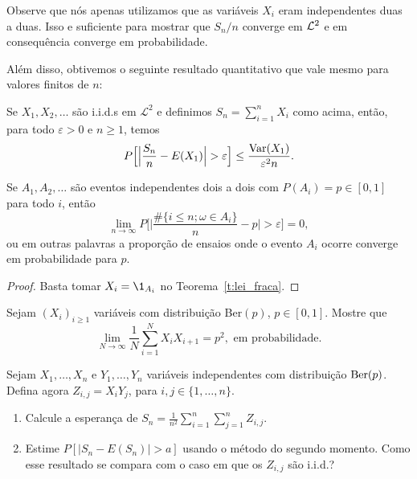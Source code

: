 \begin{remark}
 Observe que nós apenas utilizamos que as variáveis $X_i$ eram independentes duas a duas.
 Isso e suficiente para mostrar que $S_n/n$ converge em ${\mathcal L}^2$ e em consequência converge em probabilidade.
\end{remark}



Além disso, obtivemos o seguinte resultado quantitativo que vale mesmo para valores finitos de $n$:

\begin{scholia}
  Se $X_1, X_2, \dots$ são i.i.d.s em $\mathcal{L}^2$ e definimos $S_n = \sum_{i=1}^n X_i$ como acima, então, para todo $\varepsilon > 0$ e $n \geq 1$, temos
  \begin{equation}
    P \Big[\Big| \frac{S_n}{n} - E(X_1)\Big| > \varepsilon \Big] \leq \frac{\operatorname{Var}(X_1)}{\varepsilon^2 n}.
  \end{equation}
\end{scholia}





\begin{corollary}
  Se $A_1, A_2, \dots$ são eventos independentes dois a dois com $P(A_i) = p \in [0,1]$ para todo $i$, então
  \begin{equation}
    \lim_{n \to \infty} P \Big[ \Big| \frac{\#\{i \leq n; \omega \in A_i\}}{n} - p \Big| > \varepsilon \Big] = 0,
  \end{equation}
  ou em outras palavras a proporção de ensaios onde o evento $A_i$ ocorre converge em probabilidade para $p$.
\end{corollary}

\begin{proof}
  Basta tomar $X_i = \1_{A_i}$ no Teorema~\ref{t:lei_fraca}.
\end{proof}

\begin{exercise}
  Sejam $(X_i)_{i \geq 1}$ variáveis \iid com distribui\c{c}\~ao Ber$(p)$, $p \in [0,1]$. Mostre que
  \begin{equation}
    \lim_{N \to \infty} \frac 1N \sum_{i = 1}^N X_i X_{i+1} = p^2, \text{ em probabilidade.}
  \end{equation}
\end{exercise}

\begin{exercise}
  Sejam $X_1, \dots, X_n$ e $Y_1, \dots, Y_n$ variáveis independentes com distribuição $\operatorname{Ber}(p)$.
  Defina agora $Z_{i,j} = X_i Y_j$, para $i, j \in \{1, \dots, n\}$.
  \begin{enumerate}[\quad a)]
  \item Calcule a esperança de $S_n = \tfrac{1}{n^2} \sum_{i=1}^n \sum_{j=1}^n Z_{i,j}$.
  \item Estime $P[|S_n - E(S_n)| > a]$ usando o método do segundo momento. Como esse resultado se compara com o caso em que os $Z_{i,j}$ são i.i.d.?
  \end{enumerate}
\end{exercise}

